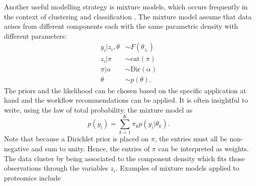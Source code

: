 \documentclass[12pt,english, journal=jpr, layout=twocolumn]{article}
\begin{document}
Another useful modelling strategy is mixture models, which occurs frequently in the context of clustering and classification \citep{Mclachlan::2019}. The mixture model assume that data arises from different components each with the same parametric density with different parameters:
\begin{equation}
\begin{split}
y_i|z_i,\theta &\sim F(\theta_{z_i})\\
z_i|\pi & \sim \text{cat}(\pi)\\
\pi|\alpha & \sim \text{Dir}(\alpha)\\
\theta & \sim p(\theta).
\end{split}	
\end{equation}
The priors and the likelihood can be chosen based on the specific application at hand and the workflow recommendations can be applied. It is often insightful to write, using the law of total probability, the mixture model as
\begin{equation}
p(y_i) = \sum_{k = 1}^{K} \pi_k p(y_i|\theta_k).
\end{equation}  
Note that because a Dirichlet prior is placed on $\pi$, the entries must all be non-negative and sum to unity. Hence, the entries of $\pi$ can be interpreted as weights. The data cluster by being associated to the component density which fits those observations through the variables $z_i$. Examples of mixture models applied to proteomics include \citet{Chung::2013, Crook::2018, Crook::2019b}
\end{document}
